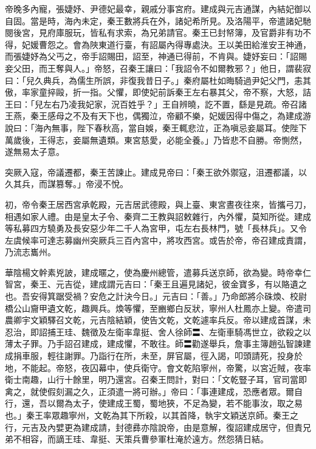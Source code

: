 \begin{pinyinscope}
 帝晚多內寵，張婕妤、尹德妃最幸，親戚分事宮府。建成與元吉通謀，內結妃御以自固。當是時，海內未定，秦王數將兵在外，諸妃希所見。及洛陽平，帝遣諸妃馳閱後宮，見府庫服玩，皆私有求索，為兄弟請官。秦王已封帑簿，及官爵非有功不得，妃媛曹怨之。會為陜東道行臺，有詔屬內得專處決。王以美田給淮安王神通，而張婕妤為父丐之，帝手詔賜田，詔至，神通已得前，不肯與。婕妤妄曰：「詔賜妾父田，而王奪與人。」帝怒，召秦王讓曰：「我詔令不如爾教邪？」他日，謂裴寂曰：「兒久典兵，為儒生所誤，非復我昔日子。」秦府屬杜如晦騎過尹妃父門，恚其傲，率家童捽毆，折一指。父懼，即使妃前訴秦王左右暴其父，帝不察，大怒，詰王曰：「兒左右乃凌我妃家，況百姓乎？」王自辨曉，訖不置，繇是見疏。帝召諸王燕，秦王感母之不及有天下也，偶獨泣，帝顧不樂，妃媛因得中傷之，為建成游說曰：「海內無事，陛下春秋高，當自娛，秦王輒悲泣，正為嗔忌妾屬耳。使陛下萬歲後，王得志，妾屬無遺類。東宮慈愛，必能全養。」乃皆悲不自勝。帝惻然，遂無易太子意。



 突厥入寇，帝議遷都，秦王苦諫止。建成見帝曰：「秦王欲外禦寇，沮遷都議，以久其兵，而謀篡奪。」帝浸不悅。



 初，帝令秦王居西宮承乾殿，元吉居武德殿，與上臺、東宮晝夜往來，皆攜弓刀，相遇如家人禮。由是皇太子令、秦齊二王教與詔敕雜行，內外懼，莫知所從。建成等私募四方驍勇及長安惡少年二千人為宮甲，屯左右長林門，號「長林兵」。又令左虞候率可達志募幽州突厥兵三百內宮中，將攻西宮。或告於帝，帝召建成責謂，乃流志巂州。



 華陰楊文幹素兇詖，建成暱之，使為慶州總管，遣募兵送京師，欲為變。時帝幸仁智宮，秦王、元吉從，建成謂元吉曰：「秦王且遍見諸妃，彼金寶多，有以賂遺之也。吾安得箕踞受禍？安危之計決今日。」元吉曰：「善。」乃命郎將尒硃煥、校尉橋公山齎甲遺文乾，趣興兵。煥等懼，至豳鄉白反狀，寧州人杜鳳亦上變。帝遣司農卿宇文穎驛召文乾，元吉陰結穎，使告文乾，文乾遽率兵反。帝以建成首謀，未忍治，即詔捕王珪、魏徵及左衛率韋挺、舍人徐師〓、左衛車騎馮世立，欲殺之以薄太子罪。乃手詔召建成，建成懼，不敢往。師〓勸遂舉兵，詹事主簿趙弘智諫建成捐車服，輕往謝罪。乃詣行在所，未至，屏官屬，徑入謁，叩頭請死，投身於地，不能起。帝怒，夜囚幕中，使兵衛守。會文乾陷寧州，帝驚，以宮近賊，夜率衛士南趣，山行十餘里，明乃還宮。召秦王問計，對曰：「文乾豎子耳，官司當即禽之，就使假刻漏之久，正須遣一將可辦。」帝曰：「事連建成，恐應者眾。爾自行，還，吾以爾為太子，使建成王蜀，蜀地狹，不足為變，若不能事汝，取之易也。」秦王率眾趣寧州，文乾為其下所殺，以其首降，執宇文穎送京師。秦王之行，元吉及內嬖更為建成請，封德彞亦陰說帝，由是意解，復詔建成居守，但責兄弟不相容，而謫王珪、韋挺、天策兵曹參軍杜淹於遠方。然怨猜日結。




\end{pinyinscope}
